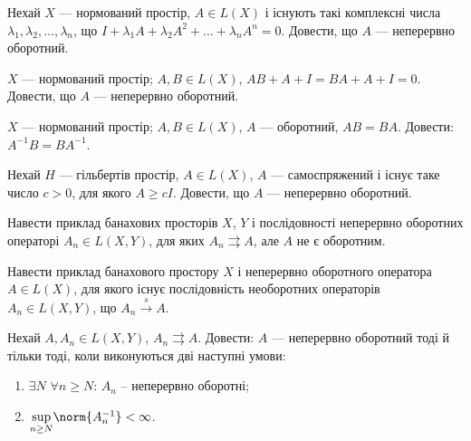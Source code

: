 \begin{exercise}
    Нехай $X$ --- нормований простір, $A \in L(X)$ і існують такі комплексні числа
    $\lambda_1, \lambda_2, \dots, \lambda_n$, що $I + \lambda_1 A + \lambda_2 A^2
    + \dots + \lambda_n A^n = 0$. Довести, що $A$ --- неперервно оборотний.
\end{exercise}

\begin{exercise}
    $X$ --- нормований простір; $A, B \in L(X)$, $AB+A+I=BA+A+I=0$.
    Довести, що $A$ --- неперервно оборотний.
\end{exercise}

\begin{exercise}
    $X$ --- нормований простір; $A, B \in L(X)$, $A$ --- оборотний, $AB=BA$.
    Довести: $A^{-1}B = BA^{-1}$.
\end{exercise}

\begin{exercise}
    Нехай $H$ --- гільбертів простір, $A \in L(X)$, $A$ --- самоспряжений
    і існує таке число $c > 0$, для якого $A \geq cI$.
    Довести, що $A$ --- неперервно оборотний.
\end{exercise}

\begin{exercise}
    Навести приклад банахових просторів $X$, $Y$ і послідовності неперервно
    оборотних операторі $A_n \in L(X,Y)$, для яких $A_n \rightrightarrows A$,
    але $A$ не є оборотним.
\end{exercise}

\begin{exercise}
    Навести приклад банахового простору $X$ і неперервно оборотного оператора
    $A \in L(X)$, для якого існує послідовність необоротних операторів
     $A_n \in L(X,Y)$, що $A_n \overset{s}{\to} A$.
\end{exercise}

\begin{exercise}
    Нехай $A, A_n \in L(X, Y)$, $A_n \rightrightarrows A$.
    Довести: $A$ --- неперервно оборотний тоді й тільки тоді, коли
    виконуються дві наступні умови:
    \begin{enumerate}
        \item $\exists N$ $\forall n \geq N$: $A_n$ -- неперервно оборотні;
        \item $\underset{n \geq N}{\sup} \norm{A_n^{-1}} < \infty$.
    \end{enumerate}
\end{exercise}